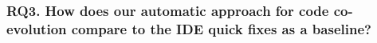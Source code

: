\subsubsection{RQ3. How does our automatic approach for code co-evolution compare to the IDE quick fixes as a baseline?}

